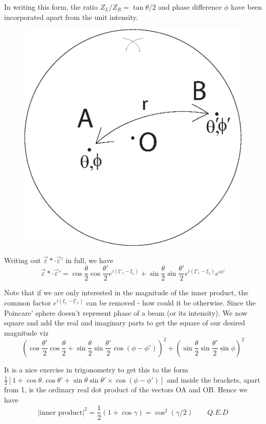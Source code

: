 In writing this form, the ratio $Z_L /Z_R = \tan \theta/2$ and phase difference $\phi$ have
been incorporated apart from the unit intensity.
\bigskip

\begin{figure}[H]
\centering
\includegraphics[scale=0.21]{src/images/chap26/7.jpg}
\end{figure}
\bigskip

Writing out $\overrightarrow{\varepsilon} \ast \cdot  \overrightarrow{\varepsilon}'$ in full, we have
$$
\overrightarrow{\varepsilon} \ast \cdot \overrightarrow{\varepsilon}' = \cos  \frac{\theta}{2} \cos \frac{\theta'}{2} e^{i (\xi'_1 - \xi_1)} + \sin \frac{\theta}{2} \sin \frac{\theta'}{2} e^{i (\xi'_1 - \xi_1)} e^{i \phi'}
$$

Note that if we are only interested in the magnitude of the inner product, the
common factor $e^{i(\xi_1 - \xi'_1)}$ can be removed - how could it be otherwise. Since the
Poincare' sphere doesn't represent phase of a beam (or its intensity). We now
square and add the real and imaginary parts to get the square of our desired
magnitude viz
$$
\left(\cos \frac{\theta'}{2} \cos \frac{\theta}{2} + \sin \frac{\theta}{2} \sin \frac{\theta'}{2} \cos (\phi - \phi') \right)^2 + \left(\sin \frac{\theta}{2} \sin \frac{\theta'}{2}
\sin \phi\right)^2
$$

It is a nice exercise in trigonometry to get this to the form $\frac{1}{2} [1 + \cos \theta . \cos \theta' +
\sin \theta \sin \theta'  \times \cos (\phi - \phi')]$ and inside the brackets, apart from 1, is the ordinary real dot product of the
vectors OA and OB. Hence we have
$$
|\text{inner product}|^2 = \frac{1}{2} (1 + \cos \gamma) = \cos^2 (\gamma/2) \qquad {Q.E.D}
$$


